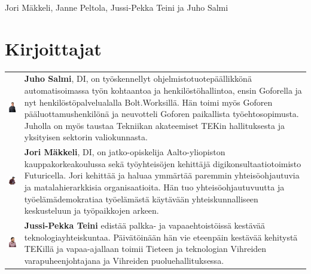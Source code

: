 \documentclass[nobib,finnish,oneside,openany,notoc,a4paper]{tufte-book}
\begin{document}
Jori Mäkkeli, Janne Peltola, Jussi-Pekka Teini ja Juho Salmi

\chapter{Kirjoittajat}

\begin{tabularx}{\textwidth}{m{25mm} m{8cm}}
    \includegraphics[width=23mm,clip,keepaspectratio]{juho.jpg} &   \textbf{Juho Salmi}, DI, on työskennellyt ohjelmistotuotepäällikkönä automatisoimassa työn kohtaantoa ja henkilöstöhallintoa, ensin Goforella ja nyt henkilöstöpalvelualalla Bolt.Worksillä. Hän toimi myös Goforen pääluottamushenkilönä ja neuvotteli Goforen paikallista työehtosopimusta. Juholla on myös taustaa Tekniikan akateemiset TEKin hallituksesta ja yksityisen sektorin valiokunnasta. \vspace{5mm} \\

    \includegraphics[width=23mm,clip,keepaspectratio]{jori.png} &   \textbf{Jori Mäkkeli}, DI, on jatko-opiskelija Aalto-yliopiston kauppakorkeakoulussa sekä työyhteisöjen kehittäjä digikonsultaatiotoimisto Futuricella. Jori kehittää ja haluaa ymmärtää paremmin yhteisöohjautuvia ja matalahierarkkisia organisaatioita. Hän tuo yhteisöohjautuvuutta ja työelämädemokratiaa työelämästä käytävään yhteiskunnalliseen keskusteluun ja työpaikkojen arkeen. \vspace{5mm}  \\

    \includegraphics[width=20mm,keepaspectratio]{jp.png} &   \textbf{Jussi-Pekka Teini} edistää palkka- ja vapaaehtoistöissä kestävää teknologiayhteiskuntaa. Päivätöinään hän vie eteenpäin kestävää kehitystä TEKillä ja vapaa-ajallaan toimii Tieteen ja teknologian Vihreiden varapuheenjohtajana ja Vihreiden puoluehallituksessa. \vspace{5mm}  \\


\end{tabularx}
\end{document}
